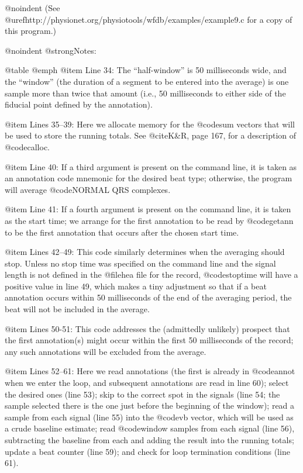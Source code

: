 {{{{{{{{{@noindent
(See @uref{http://physionet.org/physiotools/wfdb/examples/example9.c}
for a copy of this program.)

@noindent
@strong{Notes:}

@table @emph
@item Line 34:
The ``half-window'' is 50 milliseconds wide, and the ``window'' (the
duration of a segment to be entered into the average) is one sample more
than twice that amount (i.e., 50 milliseconds to either side of the
fiducial point defined by the annotation).

@item Lines 35--39:
Here we allocate memory for the @code{sum} vectors that will be used to
store the running totals.  See @cite{K&R}, page 167, for a description
of @code{calloc}.

@item Line 40:
If a third argument is present on the command line, it is taken as an
annotation code mnemonic for the desired beat type;  otherwise, the
program will average @code{NORMAL} QRS complexes.

@item Line 41:
If a fourth argument is present on the command line, it is taken as the
start time; we arrange for the first annotation to be read by
@code{getann} to be the first annotation that occurs after the chosen
start time.

@item Lines 42--49:
This code similarly determines when the averaging should stop.  Unless
no stop time was specified on the command line and the signal length is
not defined in the @file{hea} file for the record, @code{stoptime}
will have a positive value in line 49, which makes a tiny adjustment so
that if a beat annotation occurs within 50 milliseconds of the end of the
averaging period, the beat will not be included in the average.

@item Lines 50-51:
This code addresses the (admittedly unlikely) prospect that the first
annotation(s) might occur within the first 50 milliseconds of the
record; any such annotations will be excluded from the average.

@item Lines 52--61:
Here we read annotations (the first is already in @code{annot} when we
enter the loop, and subsequent annotations are read in line 60); select
the desired ones (line 53); skip to the correct spot in the signals (line
54; the sample selected there is the one just before the beginning of
the window); read a sample from each signal (line 55) into the @code{vb}
vector, which will be used as a crude baseline estimate; read
@code{window} samples from each signal (line 56), subtracting the
baseline from each and adding the result into the running totals; update
a beat counter (line 59); and check for loop termination conditions
(line 61).

}}}}}}}}}
